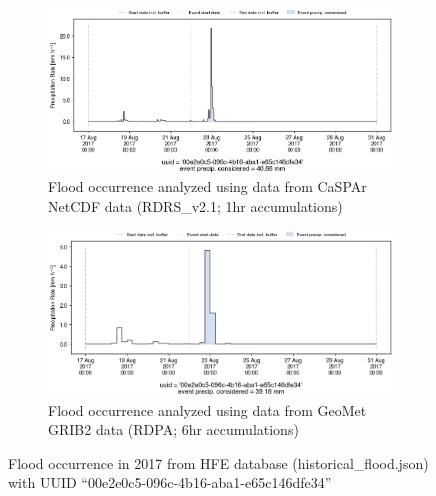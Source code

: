 \documentclass[10pt,a4paper,titlepage,parskip]{scrartcl}
\begin{document}
\begin{figure}[h]
	\begin{subfigure}[a]{1.0\textwidth}
		\centering
		\includegraphics[width=\linewidth]{figures/compare_Geomet_CaSPAr/interpolated_at_stations_occurrence_1043_identified-timesteps_RDRS_v2.1.png}
		\caption{Flood occurrence analyzed using data from CaSPAr NetCDF data (RDRS\_v2.1; 1hr accumulations)}
	\end{subfigure}
	\par\bigskip\bigskip
	\begin{subfigure}[b]{1.0\textwidth}
		\centering
		\includegraphics[width=\linewidth]{figures/compare_Geomet_CaSPAr/interpolated_at_stations_occurrence_1043_identified-timesteps_rdpa:10km:6f.png}
		\caption{Flood occurrence analyzed using data from GeoMet GRIB2 data (RDPA; 6hr accumulations)}
	\end{subfigure}
	\par\bigskip\bigskip
	\caption{Flood occurrence in 2017 from HFE database (historical\_flood.json) with UUID ``00e2e0c5-096c-4b16-aba1-e65c146dfe34''}
\end{figure}
\pagebreak
\end{document}
